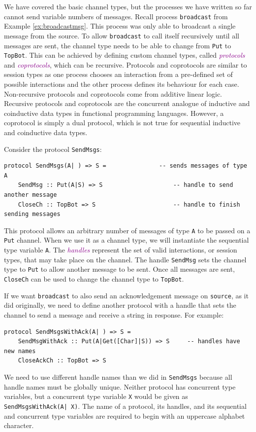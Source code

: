 \documentclass[acmsmall]{acmart}
\newcommand{\tc}[1]{\textcolor{darkMagenta}{\textit{#1}}}
\begin{document}
We have covered the basic channel types, but the processes we have written so far cannot send variable numbers of messages.
Recall process \lstinline$broadcast$ from Example \ref{ex:broadcastmsg}.
This process was only able to broadcast a single message from the source.
To allow \lstinline$broadcast$ to call itself recursively until all messages are sent, the channel type needs to be able to change from \lstinline$Put$ to \lstinline$TopBot$.
This can be achieved by defining custom channel types, called \tc{protocols} and \tc{coprotocols}, which can be recursive.
Protocols and coprotocols are similar to session types as one process chooses an interaction from a pre-defined set of possible interactions and the other process defines its behaviour for each case.
Non-recursive protocols and coprotocols come from additive linear logic.
Recursive protocols and coprotocols are the concurrent analogue of inductive and coinductive data types in functional programming languages. 
However, a coprotocol is simply a dual protocol, which is not true for sequential inductive and coinductive data types.

Consider the protocol \lstinline$SendMsgs$:
\begin{lstlisting}[label=ex:protocolpassmsgs, caption=Protocol for sending an arbitrary number of messages] 
protocol SendMsgs(A| ) => S =				-- sends messages of type A
	SendMsg :: Put(A|S) => S 					-- handle to send another message
	CloseCh :: TopBot => S 						-- handle to finish sending messages
\end{lstlisting}
This protocol allows an arbitrary number of messages of type \lstinline$A$ to be passed on a \lstinline$Put$ channel.
When we use it as a channel type, we will instantiate the sequential type variable \lstinline$A$.
The \tc{handles} represent the set of valid interactions, or session types, that may take place on the channel. 
The handle \lstinline$SendMsg$ sets the channel type to \lstinline$Put$ to allow another message to be sent.
Once all messages are sent, \lstinline$CloseCh$ can be used to change the channel type to \lstinline$TopBot$.

If we want \lstinline$broadcast$ to also send an acknowledgement message on \lstinline$source$, as it did originally, we need to define another protocol with a handle that sets the channel to send a message and receive a string in response. For example:
 \begin{lstlisting}[label=ex:protocolpassmsgswconf, caption=Protocol for sending messages and receiving acknowledgement messages] 
protocol SendMsgsWithAck(A| ) => S =
	SendMsgWithAck :: Put(A|Get([Char]|S)) => S 	-- handles have new names
	CloseAckCh :: TopBot => S 		
\end{lstlisting}
We need to use different handle names than we did in \lstinline$SendMsgs$ because all handle names must be globally unique.
Neither protocol has concurrent type variables, but a concurrent type variable \lstinline$X$ would be given as \lstinline$SendMsgsWithAck(A| X)$.
The name of a protocol, its handles, and its sequential and concurrent type variables are required to begin with an uppercase alphabet character. 
\end{document}
